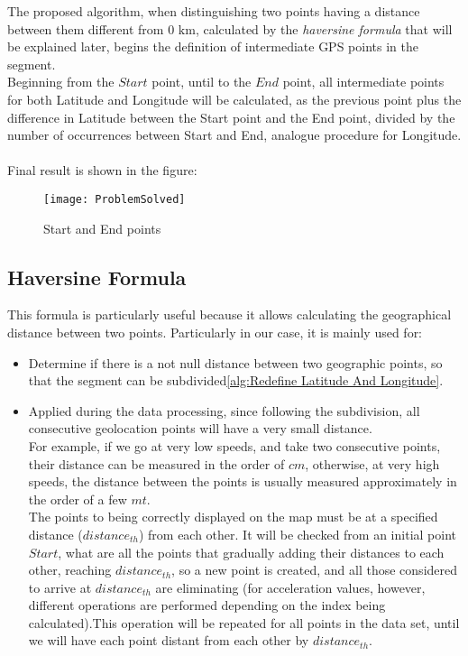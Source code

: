 \documentclass[tesi]{subfiles}
\begin{document}
The proposed algorithm, when distinguishing two points having a distance between them different from $0$ $\si{\km}$, calculated by the \textit{haversine formula} that will be explained later, begins the definition of intermediate GPS points in the segment.\\
Beginning from the $Start$ point, until to the $End$ point, all intermediate points for both Latitude and Longitude will be calculated, as the previous point plus the difference in Latitude between the Start point and the End point, divided by the number of occurrences between Start and End, analogue procedure for Longitude.\\\\
Final result is shown in the figure:

\vspace{0.15cm}
\begin{figure}[H]	
\centering
\texttt{[image: ProblemSolved]} \label{Solved GPS Points Problem}
 \caption{Start and End points}
  \label{fig:Solved GPS Points Problem}
\end{figure}
\subsection{Haversine Formula} \label{ssc:Haversine Formula}
This formula is particularly useful because it allows calculating the geographical distance between two points. Particularly in our case, it is mainly used for:
\begin{itemize}
\item Determine if there is a not null distance between two geographic points, so that the segment can be subdivided\ref{alg:Redefine Latitude And Longitude}.
\item Applied during the data processing, since following the subdivision, all consecutive geolocation points will have a very small distance.\\
For example, if we go at very low speeds, and take two consecutive points, their distance can be measured in the order of $cm$, otherwise, at very high speeds, the distance between the points is usually measured approximately in the order of a few $mt$.\\
The points to being correctly displayed on the map must be at a specified distance ($distance_{th}$) from each other.
It will be checked from an initial point $Start$, what are all the points that gradually adding their distances to each other, reaching $distance_{th}$, so a new point is created, and all those considered to arrive at $distance_{th}$ are eliminating (for acceleration values, however, different operations are performed depending on the index being calculated).This operation will be repeated for all points in the data set, until we will have each point distant from each other by $distance_{th}$.
\end{itemize}
\end{document}
